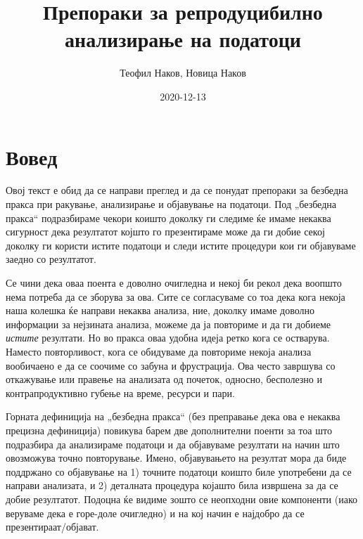 \documentclass[
]{book}
\title{Препораки за репродуцибилно анализирање на податоци}
\author{Теофил Наков, Новица Наков}
\date{2020-12-13}
\begin{document}
\maketitle

{
\setcounter{tocdepth}{1}
\tableofcontents
}
\hypertarget{intro}{%
\chapter{Вовед}\label{intro}}

Овој текст е обид да се направи преглед и да се понудат препораки за безбедна пракса при ракување, анализирање и објавување на податоци. Под „безбедна пракса`` подразбираме чекори коишто доколку ги следиме ќе имаме некаква сигурност дека резултатот којшто го презентираме може да ги добие секој доколку ги користи истите податоци и следи истите процедури кои ги објавуваме заедно со резултатот.

Се чини дека оваа поента е доволно очигледна и некој би рекол дека воопшто нема потреба да се зборува за ова. Сите се согласуваме со тоа дека кога некоја наша колешка ќе направи некаква анализа, ние, доколку имаме доволно информации за нејзината анализа, можеме да ја повториме и да ги добиеме \emph{истите} резултати. Но во пракса оваа удобна идеја ретко кога се остварува. Наместо повторливост, кога се обидуваме да повториме некоја анализа вообичаено е да се соочиме со забуна и фрустрација. Ова често завршува со откажување или правење на анализата од почеток, односно, бесполезно и контрапродуктивно губење на време, ресурси и пари.

Горната дефиниција на „безбедна пракса`` (без преправање дека ова е некаква прецизна дефиниција) повикува барем две дополнителни поенти за тоа што подразбира да анализираме податоци и да објавуваме резултати на начин што овозможува точно повторување. Имено, објавувањето на резултат мора да биде поддржано со објавување на 1) точните податоци коишто биле употребени да се направи анализата, и 2) деталната процедура којашто била извршена за да се добие резултатот. Подоцна ќе видиме зошто се неопходни овие компоненти (иако веруваме дека е горе-доле очигледно) и на кој начин е најдобро да се презентираат/објават.
\end{document}
